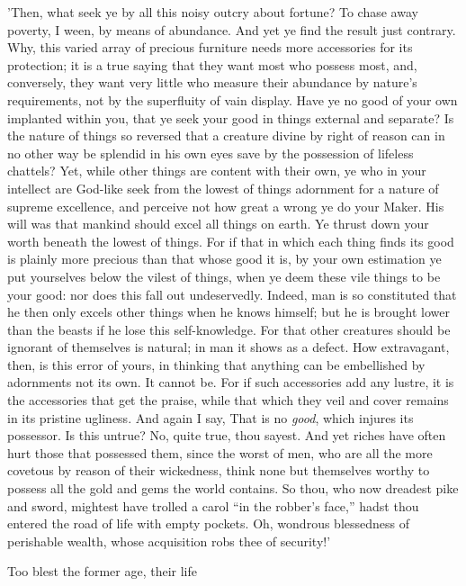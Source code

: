 'Then, what seek ye by all this noisy outcry about fortune? To chase
away poverty, I ween, by means of abundance. And yet ye find the result
just contrary. Why, this varied array of precious furniture needs more
accessories for its protection; it is a true saying that they want most
who possess most, and, conversely, they want very little who measure
their abundance by nature's requirements, not by the superfluity of vain
display. Have ye no good of your own implanted within you, that ye seek
your good in things external and separate? Is the nature of things so
reversed that a creature divine by right of reason can in no other way
be splendid in his own eyes save by the possession of lifeless chattels?
Yet, while other things are content with their own, ye who in your
intellect are God-like seek from the lowest of things adornment for a
nature of supreme excellence, and perceive not how great a wrong ye do
your Maker. His will was that mankind should excel all things on earth.
Ye thrust down your worth beneath the lowest of things. For if that in
which each thing finds its good is plainly more precious than that whose
good it is, by your own estimation ye put yourselves below the vilest of
things, when ye deem these vile things to be your good: nor does this
fall out undeservedly. Indeed, man is so constituted that he then only
excels other things when he knows himself; but he is brought lower than
the beasts if he lose this self-knowledge. For that other creatures
should be ignorant of themselves is natural; in man it shows as a
defect. How extravagant, then, is this error of yours, in thinking that
anything can be embellished by adornments not its own. It cannot be. For
if such accessories add any lustre, it is the accessories that get the
praise, while that which they veil and cover remains in its pristine
ugliness. And again I say, That is no \emph{good}, which injures its
possessor. Is this untrue? No, quite true, thou sayest. And yet riches
have often hurt those that possessed them, since the worst of men, who
are all the more covetous by reason of their wickedness, think none but
themselves worthy to possess all the gold and gems the world contains.
So thou, who now dreadest pike and sword, mightest have trolled a carol
``in the robber's face,'' hadst thou entered the road of life with empty
pockets. Oh, wondrous blessedness of perishable wealth, whose
acquisition robs thee of security!'


Too blest the former age, their life

